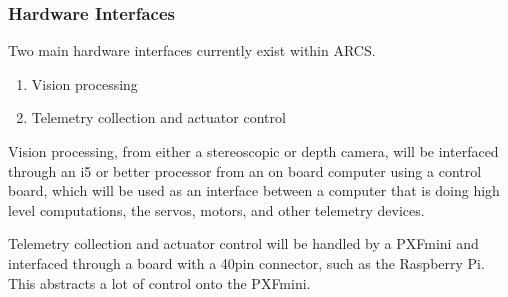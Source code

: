 \documentclass[compsoc,draftclsnofoot,onecolumn,10pt]{IEEEtran}
\begin{document}
\subsubsection{Hardware Interfaces} %
Two main hardware interfaces currently exist within ARCS. 
\begin{enumerate}
	\item Vision processing
	\item Telemetry collection and actuator control
\end{enumerate}

Vision processing, from either a stereoscopic or depth camera, will be interfaced through 
an i5 or better processor from an on board computer using a control board, which will be used as an interface between a 
computer that is doing high level computations, the servos, motors, and other telemetry 
devices. 

Telemetry collection and actuator control will be handled by a PXFmini and interfaced through a board with a 40pin connector, such as the Raspberry Pi. This abstracts a lot of control onto the PXFmini. 
\end{document}
